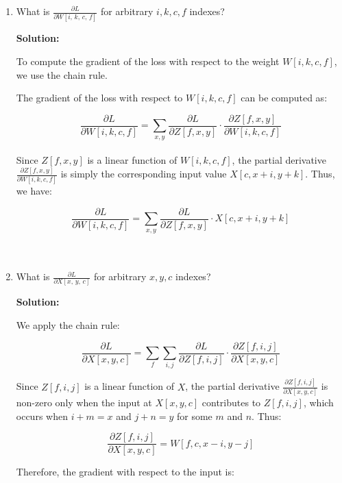 \documentclass{article}
\newenvironment{solution}{\color{blue} \smallskip \textbf{Solution:}}{}
\begin{document}
\begin{enumerate}
\begin{enumerate}
\begin{solution}
\end{solution}

        \item 
        What is $\frac{\partial L}{\partial W[i,\, k,\, c,\, f]}$ for arbitrary $i, k, c, f$ indexes? 
        
\begin{solution}

To compute the gradient of the loss with respect to the weight \( W[i, k, c, f] \), we use the chain rule.

The gradient of the loss with respect to \( W[i, k, c, f] \) can be computed as:

\[
\frac{\partial L}{\partial W[i, k, c, f]} = \sum_{x, y} \frac{\partial L}{\partial Z[f, x, y]} \cdot \frac{\partial Z[f, x, y]}{\partial W[i, k, c, f]}
\]
\\Since \( Z[f, x, y] \) is a linear function of \( W[i, k, c, f] \), the partial derivative \( \frac{\partial Z[f, x, y]}{\partial W[i, k, c, f]} \) is simply the corresponding input value \( X[c, x+i, y+k] \). Thus, we have:

\[
\frac{\partial L}{\partial W[i, k, c, f]} = \sum_{x, y} \frac{\partial L}{\partial Z[f, x, y]} \cdot X[c, x+i, y+k]
\]\\\\

\end{solution}


        \item 
        What is $\frac{\partial L}{\partial X[x,\, y,\, c]}$ for arbitrary $x, y, c$ indexes? 
        
\begin{solution}

We apply the chain rule:

\[
\frac{\partial L}{\partial X[x, y, c]} = \sum_{f} \sum_{i, j} \frac{\partial L}{\partial Z[f, i, j]} \cdot \frac{\partial Z[f, i, j]}{\partial X[x, y, c]}
\]

Since \( Z[f, i, j] \) is a linear function of \( X \), the partial derivative \( \frac{\partial Z[f, i, j]}{\partial X[x, y, c]} \) is non-zero only when the input at \( X[x, y, c] \) contributes to \( Z[f, i, j] \), which occurs when \( i+m = x \) and \( j+n = y \) for some \( m \) and \( n \). Thus:

\[
\frac{\partial Z[f, i, j]}{\partial X[x, y, c]} = W[f, c, x-i, y-j]
\]

Therefore, the gradient with respect to the input is:


\end{solution}
\end{enumerate}
\end{enumerate}
\end{document}
